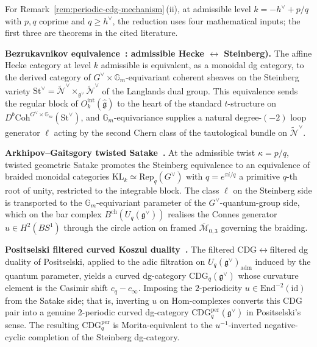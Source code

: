 \begin{remark}
\label{rem:periodic-cdg-proof-path}
For
Remark~\textup{\ref{rem:periodic-cdg-mechanism}}\,(ii), at admissible
level $k = -h^\vee + p/q$ with $p, q$ coprime and $q \geq h^\vee$,
the reduction uses four mathematical inputs; the first three are
theorems in the cited literature.

\medskip
\noindent\textbf{Bezrukavnikov equivalence~\cite{Bezrukavnikov16}:
admissible Hecke $\leftrightarrow$ Steinberg).}
The affine Hecke category at level $k$ admissible is equivalent, as a
monoidal dg category, to the derived category of
$G^\vee \!\times\! \mathbb{G}_m$-equivariant coherent sheaves on the
Steinberg variety
$\mathrm{St}^\vee = \widetilde{\mathcal{N}}^\vee
\times_{\mathfrak{g}^\vee}\!\widetilde{\mathcal{N}}^\vee$
of the Langlands dual group. This equivalence sends the regular block
of $O^{\mathrm{int}}_k(\widehat{\mathfrak{g}})$ to the heart of the
standard $t$-structure on
$D^b\mathrm{Coh}^{G^\vee\!\times\!\mathbb{G}_m}(\mathrm{St}^\vee)$, and
$\mathbb{G}_m$-equivariance supplies a natural degree-$(-2)$ loop
generator $\ell$ acting by the second Chern class of the tautological
bundle on $\widetilde{\mathcal{N}}^\vee$.

\medskip
\noindent\textbf{Arkhipov--Gaitsgory twisted Satake~\cite{ArkhipovGaitsgory09}.}
At the admissible twist $\kappa = p/q$, twisted geometric Satake
promotes the Steinberg equivalence to an equivalence of braided monoidal categories
$\mathrm{KL}_k \simeq \mathrm{Rep}_q(G^\vee)$ with
$q = e^{\pi i / q}$ a primitive $q$-th root of unity, restricted to
the integrable block. The class $\ell$ on the Steinberg side is transported to the
$\mathbb{G}_m$-equivariant parameter of the $G^\vee$-quantum-group
side, which on the bar complex
$B^{\mathrm{ch}}(U_q(\mathfrak{g}^\vee))$ realises the Connes
generator $u \in H^2(BS^1)$ through the circle action on framed
$\overline{\mathcal{M}}_{0,3}$ governing the braiding.

\medskip
\noindent\textbf{Positselski filtered curved Koszul duality~\cite{Positselski11,Positselski18}.}
The filtered CDG$\leftrightarrow$filtered dg duality of Positselski,
applied to the adic filtration on
$U_q(\mathfrak{g}^\vee)_{\mathrm{adm}}$ induced by the quantum
parameter, yields a curved dg-category
$\mathrm{CDG}_q(\mathfrak{g}^\vee)$ whose curvature element is the
Casimir shift $c_q - c_\infty$. Imposing the $2$-periodicity
$u \in \mathrm{End}^{-2}(\mathrm{id})$ from the Satake side; that is,
inverting $u$ on $\mathrm{Hom}$-complexes converts this CDG pair
into a genuine $2$-periodic curved dg-category
$\mathrm{CDG}_q^{\mathrm{per}}(\mathfrak{g}^\vee)$ in Positselski's
sense. The resulting $\mathrm{CDG}_q^{\mathrm{per}}$ is Morita-equivalent
to the $u^{-1}$-inverted negative-cyclic completion of the Steinberg
dg-category.


\end{remark}
